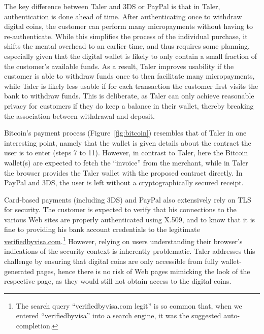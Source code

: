 \documentclass{IEEEtran}
\begin{document}
The key difference between Taler and 3DS or PayPal is that
in Taler, authentication is done ahead of time.
After authenticating once to withdraw digital coins, the customer can
perform many micropayments without having to re-authenticate.  While
this simplifies the process of the individual purchase, it shifts the
mental overhead to an earlier time, and thus requires some planning,
especially given that the digital wallet is likely to only contain a
small fraction of the customer's available funds.  As a result, Taler
improves usability if the customer is able to withdraw funds once to
then facilitate many micropayments, while Taler is likely less usable
if for each transaction the customer first visits the bank to withdraw
funds.  This is deliberate, as Taler can only achieve reasonable
privacy for customers if they do keep a balance in their wallet,
thereby breaking the association between withdrawal and deposit.

Bitcoin's payment process (Figure~\ref{fig:bitcoin}) resembles that of
Taler in one interesting point, namely that the wallet is given
details about the contract the user is to enter (steps 7 to 11).
However, in contrast to Taler, here the Bitcoin wallet(s) are expected
to fetch the ``invoice'' from the merchant, while in Taler the browser
provides the Taler wallet with the proposed contract directly.  In
PayPal and 3DS, the user is left without a cryptographically secured
receipt.

Card-based payments (including 3DS) and PayPal also extensively rely
on TLS for security.  The customer is expected to verify that his
connections to the various Web sites are properly authenticated using
X.509, and to know that it is fine to providing his bank account
credentials to the legitimate
\url{verifiedbyvisa.com}.\footnote{The search query
``verifiedbyvisa.com legit'' is so common that, when we entered
``verifiedbyvisa'' into a search engine, it was the suggested
auto-completion.}  However, relying on users understanding their
browser's indications of the security context is inherently
problematic.  Taler addresses this challenge by ensuring that digital
coins are only accessible from fully wallet-generated pages, hence
there is no risk of Web pages mimicking the look of the respective
page, as they would still not obtain access to the digital coins.
\end{document}
